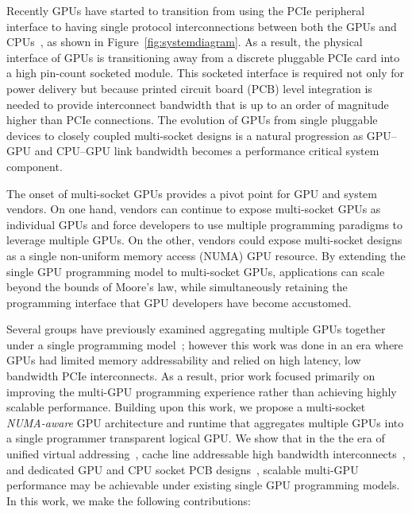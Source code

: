 Recently GPUs have started to transition from using the PCIe peripheral 
interface to having single protocol interconnections between both the GPUs and 
CPUs~\cite{dgx,SierraHPC,AMDINFINITYFABRIC}, as shown in 
Figure~\ref{fig:systemdiagram}. As a result, the physical interface of GPUs is 
transitioning away from a discrete pluggable PCIe card into a high pin-count 
socketed module. This socketed interface is required 
not only for power delivery but because
printed circuit board (PCB) level integration is needed to provide
interconnect bandwidth that is up to an order of magnitude higher than PCIe
connections. The evolution of GPUs from single pluggable devices to closely
coupled multi-socket designs is a natural progression as GPU--GPU and CPU--GPU
link bandwidth becomes a performance critical system component.

The onset of multi-socket GPUs provides a pivot point for GPU and system 
vendors. On one hand, vendors can continue to expose multi-socket GPUs as 
individual GPUs and force developers to use multiple programming paradigms to 
leverage multiple GPUs. On the other, vendors could expose multi-socket 
designs as a single non-uniform memory access (NUMA) GPU resource.  By 
extending the single GPU programming model to multi-socket GPUs,  applications 
can scale beyond the bounds of Moore's law, while simultaneously retaining the 
programming interface that GPU developers have become accustomed.

Several groups have previously examined aggregating multiple GPUs together under 
a single programming model~\cite{lee2013transparent,Cabezas2015}; however this 
work was done in an era where GPUs had limited memory addressability and relied 
on high latency, low bandwidth PCIe interconnects. As a result, prior work 
focused primarily on improving the multi-GPU programming experience rather than 
achieving highly scalable performance. Building upon this work, we propose a 
multi-socket \textit{NUMA-aware} GPU architecture and runtime that aggregates 
multiple GPUs into a single programmer transparent logical GPU. We show that in 
the the era of unified virtual addressing~\cite{UVM}, cache line addressable 
high bandwidth interconnects~\cite{NVLINK}, and dedicated GPU and CPU socket PCB 
designs~\cite{SierraHPC}, scalable multi-GPU performance may be achievable under 
existing single GPU programming models. In this work, we make the following 
contributions:

